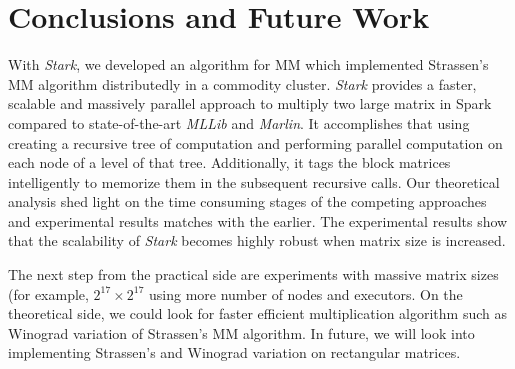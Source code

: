 
\section{Conclusions and Future Work}
\label{sec:conclusion}
With \textit{Stark}, we developed an algorithm for MM which implemented Strassen's MM algorithm distributedly in a commodity cluster. \textit{Stark} provides a faster, scalable and massively parallel approach to multiply two large matrix in Spark compared to state-of-the-art \textit{MLLib} and \textit{Marlin}. It accomplishes that using creating a recursive tree of computation and performing parallel computation on each node of a level of that tree. Additionally, it tags the block matrices intelligently to memorize them in the subsequent recursive calls. Our theoretical analysis shed light on the time consuming stages of the competing approaches and experimental results matches with the earlier. The experimental results show that the scalability of \textit{Stark} becomes highly robust when matrix size is increased.

The next step from the practical side are experiments with massive matrix sizes (for example, $2^{17}\times 2^{17}$ using more number of nodes and executors. On the theoretical side, we could look for faster efficient multiplication algorithm such as Winograd variation \cite{coppersmith1990matrix} of Strassen's MM algorithm. In future, we will look into implementing Strassen's and Winograd variation on rectangular matrices.   


